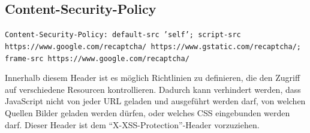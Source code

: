\documentclass[12pt,DIV14,BCOR10mm,a4paper,parskip=half-,headsepline,headinclude,english,ngerman,bibliography=totocnumbered]{scrreprt}
\begin{document}
\subsection{Content-Security-Policy}
\begin{sloppypar}
\texttt{Content-Security-Policy: default-src 'self'; script-src https://www.google.com/recaptcha/ https://www.gstatic.com/recaptcha/; frame-src https://www.google.com/recaptcha/}
\end{sloppypar}
Innerhalb diesem Header ist es möglich Richtlinien zu definieren, die den Zugriff auf verschiedene Resourcen kontrollieren.
Dadurch kann verhindert werden, dass JavaScript nicht von jeder URL geladen und ausgeführt werden darf, von welchen Quellen Bilder geladen werden dürfen, oder welches CSS eingebunden werden darf.
Dieser Header ist dem \enquote{X-XSS-Protection}-Header vorzuziehen.


\printbibliography

\printacronyms[title=Abkürzungsverzeichnis,toctitle=Abkürzungsverzeichnis]
\printglossary[title=Glossar,toctitle=Glossar,type=main]

\iftotalfigures
  \listoffigures
\fi

\end{document}
